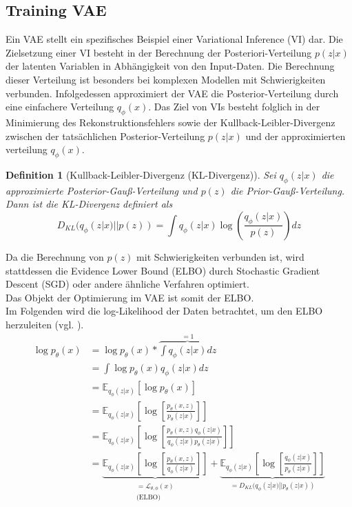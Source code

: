\documentclass[%
thesis=student,%
coverpage=false,%
titlepage=false,%
headmarks=true, %
german,%
font=libertine, %
math=newpxtx, %
BCOR=5mm,%
coverBCOR=11mm%
]{tumbook}
\theoremstyle{break}
\newtheorem{definition}{Definition}[section]
\begin{document}
\subsection{Training VAE}
Ein VAE stellt ein spezifisches Beispiel einer Variational Inference (VI) dar. Die Zielsetzung einer VI besteht in der Berechnung der  Posteriori-Verteilung $p(z|x)$ der latenten Variablen in Abhängigkeit von den Input-Daten.  Die Berechnung dieser Verteilung ist besonders bei komplexen Modellen mit Schwierigkeiten verbunden. Infolgedessen approximiert der VAE die Posterior-Verteilung durch eine einfachere Verteilung $q_\phi(x)$. Das Ziel von VIs besteht folglich in der Minimierung des Rekonstruktionsfehlers sowie der Kullback-Leibler-Divergenz zwischen der tatsächlichen Posterior-Verteilung $p(z|x)$ und  der approximierten verteilung $q_\phi(x)$. 
\begin{definition}[Kullback-Leibler-Divergenz (KL-Divergenz)]
Sei $q_\phi(z|x)$ die approximierte Posterior-Gauß-Verteilung und $p(z)$ die Prior-Gauß-Verteilung. Dann ist die KL-Divergenz definiert als
$$D_{KL}(q_\phi(z|x)||p(z))= \int q_\phi(z|x) \log \left(\frac{q_\phi(z|x)}{p(z)} \right)dz$$
\end{definition}\noindent
Da die Berechnung von  $p(z)$ mit Schwierigkeiten verbunden ist, wird  stattdessen die Evidence Lower Bound (ELBO) durch Stochastic Gradient Descent (SGD) oder andere ähnliche Verfahren optimiert.\\
Das Objekt der Optimierung im VAE ist somit der ELBO. \\
Im Folgenden wird die log-Likelihood der Daten betrachtet, um den ELBO herzuleiten (vgl. \cite{IntroductiontoVAEs}).\\
\begin{align}
 	\log p_\theta(x) &= \log p_\theta(x) * \overbrace{\int q_\phi(z|x) dz}^{=1} \\
 	&= \int \log p_\theta(x) q_\phi(z|x) dz \\
 	&= \mathbb{E}_{q_\phi(z|x)}[\log p_\theta(x)] \\
 	&= \mathbb{E}_{q_\phi(z|x)}\left[\log\left[ \frac{p_\theta(x,z)}{p_\theta(z|x)}\right]\right] \\
 	&= \mathbb{E}_{q_\phi(z|x)}\left[\log\left[ \frac{p_\theta(x,z)q_\phi(z|x)}{q_\phi(z|x)p_\theta(z|x)}\right]\right] \\
 	&= \underbrace{\mathbb{E}_{q_\phi(z|x)}\left[\log\left[ \frac{p_\theta(x,z)}{q_\phi(z|x)}\right]\right]}_{\substack{\text{$= \mathcal{L}_{\theta,\phi}(x)$}\\\text{(ELBO)}}} + \underbrace{\mathbb{E}_{q_\phi(z|x)}\left[\log\left[ \frac{q_\phi(z|x)}{p_\theta(z|x)}\right]\right]}_{=D_{KL}(q_\phi(z|x)||p_\theta(z|x))} \label{ELBO & DKL Gleichung}
\end{align}
\end{document}
